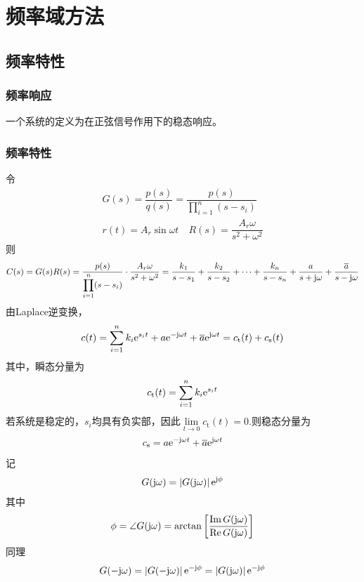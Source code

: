 \chapter{频率域方法}
\thispagestyle{empty}
\section{频率特性}
\subsection{频率响应}

\tdefination[频率响应]
一个系统的定义为在正弦信号作用下的稳态响应。
\vspace*{1em}

\subsection{频率特性}
令
\begin{align*}
	G(s) = \dfrac{p(s)}{q(s)} = \dfrac{p(s)}{\displaystyle \prod_{i = 1}^n (s - s_i)}\\
	r(t) = A_r \sin \omega t \quad R(s) = \dfrac{A_r\omega}{s^2 + \omega ^2}
\end{align*}
则
\begin{align}
	C(s) = G(s)R(s) = \dfrac{p(s)}{\displaystyle \prod_{i = 1}^n (s - s_i)} \cdot \dfrac{A_r\omega}{s^2 + \omega ^2} = \dfrac{k_1}{s - s_1} + \dfrac{k_2}{s-s_2} + \cdots +\dfrac{k_n}{s - s_n} + \dfrac{a}{s + \text{j} \omega} + \dfrac{\overline{a}}{s - \text{j} \omega}
\end{align}
由Laplace逆变换，
\begin{align}
	c(t) = \sum_{i = 1}^n k_i{\rm{e}}^{s_i t} + a{\rm{e}}^{-\text{j} \omega t} + \overline{a} {\rm{e}} ^{\text{j} \omega t} = c_{\text{t}}(t) + c_{\text{s}}(t)
\end{align}
其中，瞬态分量为
\begin{align}
	c_{\text{t}}(t) = \sum_{i = 1}^n k_i {\rm{e}}^{s_it}
\end{align}
若系统是稳定的，$s_i$均具有负实部，因此$\lim\limits_{t \to 0} c_{\text{t}} (t) = 0$.则稳态分量为
\begin{align}
	c_{\text{s}} = a {\rm{e}}^{- \text{j} \omega t} + \overline{a} {\rm{e}}^{\text{j} \omega t}
\end{align}
记
\begin{align}
	G(\text{j} \omega )= \left|G(\text{j} \omega )\right|{\rm{e}}^{\text{j} \phi}
\end{align}
其中
\begin{align*}
	\phi = \angle G(\text{j} \omega) = \arctan \left[\dfrac{\text{Im}\,G(\text{j} \omega) }{\text{Re} \,G(\text{j} \omega )}\right]
\end{align*}
同理
\begin{align}
	G(-\text{j} \omega) = \left|G(-\text{j} \omega )\right| {\rm{e}}^{-\text{j} \phi}= \left|G(\text{j} \omega )\right|{\rm{e}}^{-\text{j} \phi}
\end{align}

